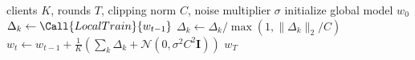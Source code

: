 
\begin{algorithm}[t]
\caption{Federated averaging with differential privacy}
\label{alg:dpfedavg}
\begin{algorithmic}[1]
\Require clients $K$, rounds $T$, clipping norm $C$, noise multiplier $\sigma$
\State initialize global model $w_0$
    \State $\Delta_k \gets \Call{LocalTrain}{w_{t-1}}$
    \State $\Delta_k \gets \Delta_k / \max\left(1, \lVert \Delta_k \rVert_2 / C\right)$
  \EndFor
  \State $w_t \gets w_{t-1} + \frac{1}{K}\left(\sum_k \Delta_k
         + \mathcal{N}(0, \sigma^2 C^2 \mathbf{I})\right)$ 
\EndFor
\State \Return $w_T$
\end{algorithmic}
\end{algorithm}
